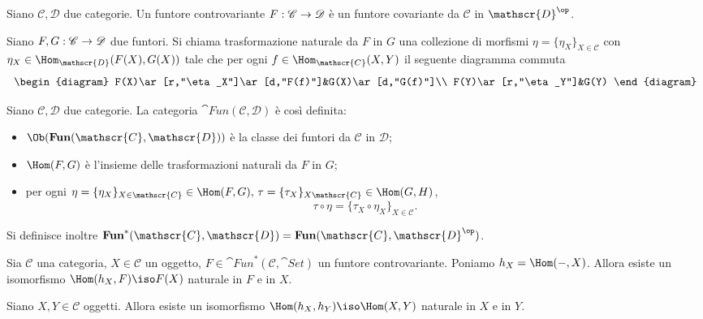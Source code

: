\begin{definition}
Siano $\mathscr{C},\mathscr{D}$ due categorie. Un funtore controvariante $F:\mathscr{C}\rightarrow \mathscr{D}$ è un funtore covariante da $\mathscr{C}$ in $\mathscr{D}^{\op}$.
\end{definition}
\begin{definition}
Siano $F,G:\mathscr{C}\rightarrow \mathscr{D}$ due funtori. Si chiama trasformazione naturale da $F$ in $G$ una collezione di morfismi $\eta=\{\eta_X\}_{X\in\mathscr{C}}$ con $\eta_X\in\Hom_\mathscr{D}(F(X),G(X))$ tale che per ogni $f\in\Hom_\mathscr{C}(X,Y)$ il seguente diagramma commuta
$$
\begin{diagram}
F(X)\ar[r,"\eta_X"]\ar[d,"F(f)"]&G(X)\ar[d,"G(f)"]\\
F(Y)\ar[r,"\eta_Y"]&G(Y)
\end{diagram}
$$
\end{definition}
\begin{definition}
Siano $\mathscr{C},\mathscr{D}$ due categorie. La categoria $\cat{Fun}(\mathscr{C},\mathscr{D})$ è così definita:
\begin{itemize}
\item $\Ob(\cat{Fun}(\mathscr{C},\mathscr{D}))$ è la classe dei funtori da $\mathscr{C}$ in $\mathscr{D}$;
\item $\Hom(F,G)$ è l'insieme delle trasformazioni naturali da $F$ in $G$;
\item per ogni $\eta=\{\eta_X\}_{X\in\mathscr{C}}\in\Hom(F,G)\comma\tau=\{\tau_X\}_{X\mathscr{C}}\in\Hom(G,H)$,
$$
\tau\circ\eta=\{\tau_X\circ\eta_X\}_{X\in\mathscr{C}}.
$$
\end{itemize}
Si definisce inoltre $\cat{Fun}^*(\mathscr{C},\mathscr{D})=\cat{Fun}(\mathscr{C},\mathscr{D}^{\op})$.
\end{definition}
\begin{proposition}
Sia $\mathscr{C}$ una categoria, $X\in\mathscr{C}$ un oggetto, $F\in\cat{Fun}^*(\mathscr{C},\cat{Set})$ un funtore controvariante. Poniamo $h_X=\Hom(\--,X)$. Allora esiste un isomorfismo $\Hom(h_X,F)\iso F(X)$ naturale in $F$ e in $X$.
\end{proposition}
\begin{corollary}
Siano $X,Y\in\mathscr{C}$ oggetti. Allora esiste un isomorfismo $\Hom(h_X,h_Y)\iso\Hom(X,Y)$ naturale in $X$ e in $Y$.
\end{corollary}
